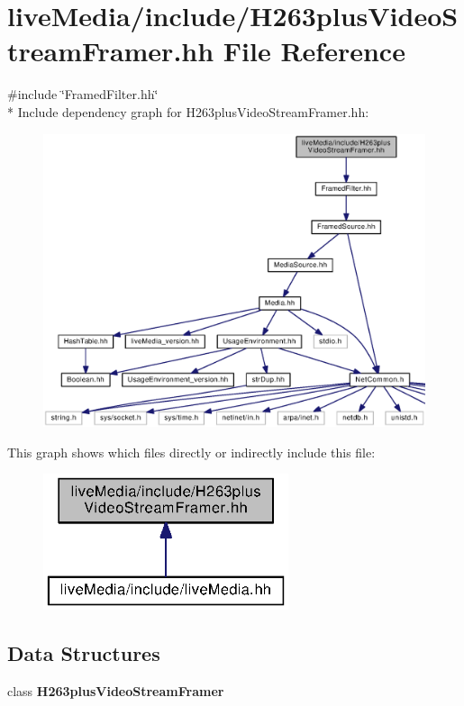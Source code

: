 \section{live\+Media/include/\+H263plus\+Video\+Stream\+Framer.hh File Reference}
\label{H263plusVideoStreamFramer_8hh}
{\ttfamily \#include \char`\"{}Framed\+Filter.\+hh\char`\"{}}\\*
Include dependency graph for H263plus\+Video\+Stream\+Framer.\+hh\+:
\nopagebreak
\begin{figure}[H]
\begin{center}
\leavevmode
\includegraphics[width=350pt]{H263plusVideoStreamFramer_8hh__incl}
\end{center}
\end{figure}
This graph shows which files directly or indirectly include this file\+:
\nopagebreak
\begin{figure}[H]
\begin{center}
\leavevmode
\includegraphics[width=204pt]{H263plusVideoStreamFramer_8hh__dep__incl}
\end{center}
\end{figure}
\subsection*{Data Structures}
\begin{DoxyCompactItemize}
\item 
class {\bf H263plus\+Video\+Stream\+Framer}
\end{DoxyCompactItemize}
